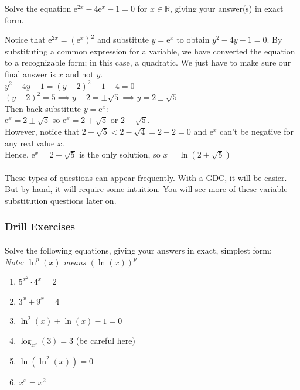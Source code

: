 \documentclass[12pt, a4paper, titlepage, twoside]{article}
\newcommand*{\R}{\mathbb{R}}
\newcommand*{\e}{\textrm{e}}
\newcounter{excount}[subsection]
\begin{document}
	\begin{ex}
		Solve the equation $\e^{2x} - 4\e^x - 1 = 0$ for $x \in \R$, giving your answer(s) in exact form.
		
		\hfill
		\tcbline
		\hfill
		
		Notice that $\e^{2x} = (\e^x)^2$ and substitute $y = \e^x$ to obtain $y^2 - 4y - 1 = 0$. By substituting a common expression
		for a variable, we have converted the equation to a recognizable form; in this case, a quadratic. We just have to make sure our
		final answer is $x$ and not $y$.\\
		
		$y^2 - 4y - 1 = (y-2)^2 - 1 - 4 = 0$\\
		$(y-2)^2 = 5 \implies y-2 = \pm \sqrt{5} \implies y = 2 \pm \sqrt{5}$\\
		
		Then back-substitute $y = \e^x$:\\
		$\e^x = 2 \pm \sqrt{5}$ so $\e^x = 2+\sqrt{5}$ or $2 - \sqrt{5}$.\\
		
		However, notice that $2-\sqrt{5} < 2 - \sqrt{4} = 2 - 2 = 0$ and $\e^x$ can't be negative for any real value $x$.\\
		
		Hence, $\e^x = 2 + \sqrt{5}$ is the only solution, so $x = \ln(2+\sqrt{5})$
	\end{ex}
	
	\paragraph{}
	These types of questions can appear frequently. With a GDC, it will be easier. But by hand, it will require some intuition. You will
	see more of these variable substitution questions later on.
	
	\subsubsection*{Drill Exercises}
	
	\paragraph{}
	 Solve the following equations, giving your answers in exact, simplest form:\\
	\textit{Note: $\ln^p(x)$ means $(\ln(x))^p$}	
	
	\begin{multicols}{2}
		\begin{enumerate}[label=\textbf{(\alph*)}]
			\item $5^{x^2} \cdot 4^x = 2$ 
			\item $3^x + 9^x = 4$
			\item $\ln^2(x) + \ln(x) - 1 = 0$
			\item $\log_{x^2}(3) = 3$ (be careful here)
			\item $\ln(\ln^{2}(x)) = 0$
			\item $x^x = x^2$
		\end{enumerate}
	\end{multicols}
	
\end{document}
